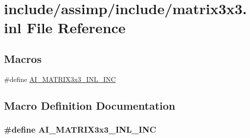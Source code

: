 \hypertarget{matrix3x3_8inl}{\section{include/assimp/include/matrix3x3.inl File Reference}
\label{matrix3x3_8inl}
}
\subsection*{Macros}
\begin{DoxyCompactItemize}
\item 
\#define \hyperlink{matrix3x3_8inl_a2b803fc081e63b7b5acaef4a18035eee}{A\-I\-\_\-\-M\-A\-T\-R\-I\-X3x3\-\_\-\-I\-N\-L\-\_\-\-I\-N\-C}
\end{DoxyCompactItemize}


\subsection{Macro Definition Documentation}
\hypertarget{matrix3x3_8inl_a2b803fc081e63b7b5acaef4a18035eee}{
\subsubsection[{A\-I\-\_\-\-M\-A\-T\-R\-I\-X3x3\-\_\-\-I\-N\-L\-\_\-\-I\-N\-C}]{\setlength{\rightskip}{0pt plus 5cm}\#define A\-I\-\_\-\-M\-A\-T\-R\-I\-X3x3\-\_\-\-I\-N\-L\-\_\-\-I\-N\-C}}\label{matrix3x3_8inl_a2b803fc081e63b7b5acaef4a18035eee}
